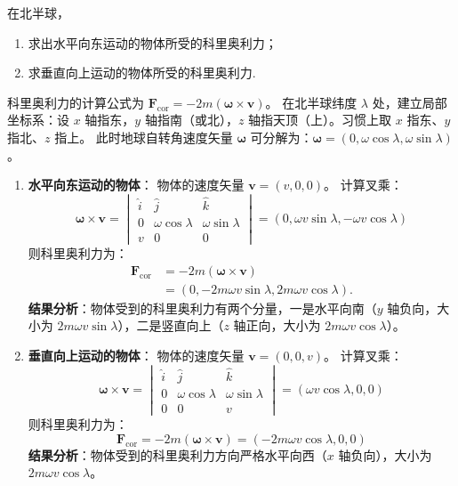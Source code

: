\begin{exercise}\label{ex:3.8}
在北半球，
\begin{enumerate}
  \item[(a)] 求出水平向东运动的物体所受的科里奥利力；
  \item[(b)] 求垂直向上运动的物体所受的科里奥利力.
\end{enumerate}
\end{exercise}
\begin{solution}
科里奥利力的计算公式为 $\boldsymbol{F}_{\mathrm{cor}} = -2m (\boldsymbol{\omega} \times \boldsymbol{v})$。
在北半球纬度 $\lambda$ 处，建立局部坐标系：设 $x$ 轴指东，$y$ 轴指南（或北），$z$ 轴指天顶（上）。习惯上取 $x$ 指东、$y$ 指北、$z$ 指上。
此时地球自转角速度矢量 $\boldsymbol{\omega}$ 可分解为：$\boldsymbol{\omega} = (0, \omega \cos\lambda, \omega \sin\lambda)$。

\begin{enumerate}
    \item[(a)] \textbf{水平向东运动的物体}：
    物体的速度矢量 $\boldsymbol{v} = (v, 0, 0)$。
    计算叉乘：
    $$ \boldsymbol{\omega} \times \boldsymbol{v} = 
    \begin{vmatrix}
    \hat{i} & \hat{j} & \hat{k} \\
    0 & \omega \cos\lambda & \omega \sin\lambda \\
    v & 0 & 0 
    \end{vmatrix}
    = (0, \omega v \sin\lambda, -\omega v \cos\lambda) $$
    则科里奥利力为：
    \[
    \begin{aligned}
    \boldsymbol{F}_{\mathrm{cor}}
      &= -2m (\boldsymbol{\omega} \times \boldsymbol{v}) \\
      &= (0,-2m\omega v\sin\lambda,2m\omega v\cos\lambda).
    \end{aligned}
    \]
    \textbf{结果分析}：物体受到的科里奥利力有两个分量，一是水平向南（$y$ 轴负向，大小为 $2m\omega v \sin\lambda$），二是竖直向上（$z$ 轴正向，大小为 $2m\omega v \cos\lambda$）。

    \item[(b)] \textbf{垂直向上运动的物体}：
    物体的速度矢量 $\boldsymbol{v} = (0, 0, v)$。
    计算叉乘：
    $$ \boldsymbol{\omega} \times \boldsymbol{v} = 
    \begin{vmatrix}
    \hat{i} & \hat{j} & \hat{k} \\
    0 & \omega \cos\lambda & \omega \sin\lambda \\
    0 & 0 & v 
    \end{vmatrix}
    = (\omega v \cos\lambda, 0, 0) $$
    则科里奥利力为：
    $$ \boldsymbol{F}_{\mathrm{cor}} = -2m (\boldsymbol{\omega} \times \boldsymbol{v}) = (-2m\omega v \cos\lambda, 0, 0) $$
    \textbf{结果分析}：物体受到的科里奥利力方向严格水平向西（$x$ 轴负向），大小为 $2m\omega v \cos\lambda$。
\end{enumerate}
\end{solution}

